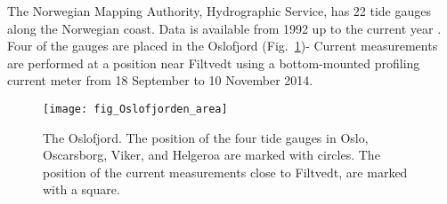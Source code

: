 

The Norwegian Mapping Authority, Hydrographic Service, has 22 tide gauges along the Norwegian coast. Data is available from 1992 up to the current year \cite[]{tide16}. Four of the gauges are placed in the Oslofjord  (Fig.~\ref{fig:area1})-%
Current measurements are performed at a position near Filtvedt using a bottom-mounted profiling current meter from 18 September to 10 November 2014.

\begin{figure}[htb]
\centering
\texttt{[image: fig\_Oslofjorden\_area]}
\caption{The Oslofjord. The position of the four tide gauges in Oslo, Oscarsborg, Viker, and Helgeroa are marked with circles. The position of the current measurements close to Filtvedt, are marked with a square.}
\label{fig:area1}
\end{figure}


